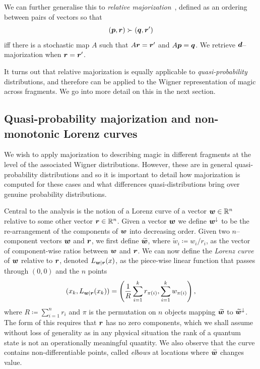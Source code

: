 \documentclass[pra,
aps,
twocolumn,
superscriptaddress,
groupedaddress,
nofootinbib,
reprint
]{revtex4-1}
\begin{document}
We can further generalise this to \emph{relative majorization}~\cite{Ruch_1976, ruch_mixing_1978, Renes_2016, Buscemi_2017}, defined as an ordering between pairs of vectors so that 
\begin{equation}
	(\boldsymbol{p},\boldsymbol{r}) \succ (\boldsymbol{q}, \boldsymbol{r}')
\end{equation}
iff there is a stochastic map $A$ such that $A\boldsymbol{r} = \boldsymbol{r}'$ and $A\boldsymbol{p} = \boldsymbol{q}$. We retrieve $\bm{d}$--majorization when $\boldsymbol{r} = \boldsymbol{r}'$.

It turns out that relative majorization is equally applicable to \emph{quasi-probability} distributions, and therefore can be applied to the Wigner representation of magic across fragments. We go into more detail on this in the next section.

\subsection{Quasi-probability majorization and non-monotonic Lorenz curves}
\label{sec:lc}

We wish to apply majorization to describing magic in different fragments at the level of the associated Wigner distributions. However, these are in general quasi-probability distributions and so it is important to detail how majorization is computed for these cases and what differences quasi-distributions bring over genuine probability distributions.

Central to the analysis is the notion of a Lorenz curve of a vector $\boldsymbol{w} \in \mathbb{R}^n$ relative to some other vector $\boldsymbol{r} \in \mathbb{R}^n$. Given a vector $\boldsymbol{w}$ we define $\boldsymbol{w}^\downarrow$ to be the re-arrangement of the components of $\boldsymbol{w}$ into decreasing order. Given two $n$--component vectors $\boldsymbol{w}$ and $\boldsymbol{r}$, we first define $\widetilde{\boldsymbol{w}}$, where $\widetilde{w}_i \coloneqq w_i/r_i$, as the vector of component-wise ratios between $\boldsymbol{w}$ and $\boldsymbol{r}$.
We can now define the \emph{Lorenz curve} of $\boldsymbol{w}$ relative to $\boldsymbol{r}$, denoted $L_{\boldsymbol{w}|\boldsymbol{r}}(x)$, as the piece-wise linear function that passes through $(0,0)$ and the $n$ points
\begin{equation}
\label{eq:lc}
        (x_k,L_{\boldsymbol{w}|\boldsymbol{r}}(x_k)) =\left( \frac{1}{R}\sum_{i=1}^k r_{\pi(i)}, \sum_{i=1}^k w_{\pi(i)} \right),
\end{equation}
where $R\coloneqq \sum_{i=1}^n r_i$ and $\pi$ is the permutation on $n$ objects mapping $\widetilde{\boldsymbol{w}}$ to $\widetilde{\boldsymbol{w}}^{\downarrow}$. The form of this requires that $\boldsymbol{r}$ has no zero components, which we shall assume without loss of generality as in any physical situation the rank of a quantum state is not an operationally meaningful quantity.
We also observe that the curve contains non-differentiable points, called \emph{elbows} at locations where $\widetilde{\bm{w}}$ changes value.
\end{document}
